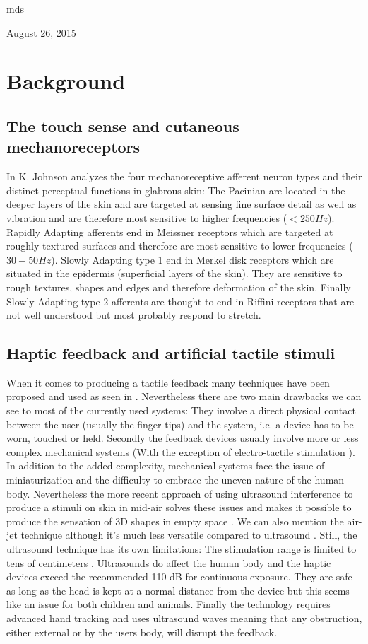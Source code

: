 \documentclass[10pt,journal,compsoc]{IEEEtran}
\begin{document}
\hfill mds
 
\hfill August 26, 2015

\section{Background}
	\subsection{The touch sense and cutaneous mechanoreceptors}
	In \cite{johnson2001con} K. Johnson analyzes the four mechanoreceptive  afferent  neuron types and their distinct perceptual functions in glabrous skin: 
	The Pacinian are located in the deeper layers of the skin and are targeted at sensing fine surface detail as well as vibration and are therefore most sensitive to higher frequencies ($<250Hz$).
	Rapidly Adapting afferents end in Meissner receptors which are targeted at roughly textured surfaces and therefore are most sensitive to lower frequencies ($30-50Hz$).
	Slowly Adapting type 1 end in Merkel disk receptors which are situated in the epidermis (superficial layers of the skin). They are sensitive to rough textures, shapes and edges and therefore deformation of the skin.
	Finally Slowly Adapting type 2 afferents are thought to end in Riffini receptors that are not well understood but most probably respond to stretch.
	
	\subsection{Haptic feedback and artificial tactile stimuli}
	When it comes to producing a tactile feedback many techniques have been proposed and used as seen in \cite{benali2004isr}. Nevertheless there are two main drawbacks we can see to most of the currently used systems:
	They involve a direct physical contact between the user (usually the finger tips) and the system, i.e. a device has to be worn, touched or held.
	Secondly the feedback devices usually involve more or less complex mechanical systems (With the exception of electro-tactile stimulation \cite{kaezmarek1991tbe}). In addition to the added complexity, mechanical systems face the issue of miniaturization and the difficulty to embrace the uneven nature of the human body.
	Nevertheless the more recent approach of using ultrasound interference to produce a stimuli on skin in mid-air \cite{carter2013uist} solves these issues and makes it possible to produce the sensation of 3D shapes in empty space \cite{sasia2014acm}. We can also mention the air-jet technique although it's much less versatile compared to ultrasound \cite{arafsha2015book}. Still, the ultrasound technique has its own limitations:
	The stimulation range is limited to tens of centimeters \cite{long2014acm}.
	Ultrasounds do affect the human body and the haptic devices exceed the recommended 110 dB for continuous exposure. They are safe as long as the head is kept at a normal distance from the device \cite{long2014acm} but this seems like an issue for both children and animals.
	Finally the technology requires advanced hand tracking and uses ultrasound waves meaning that any obstruction, either external or by the users body, will disrupt the feedback.
	
\end{document}
